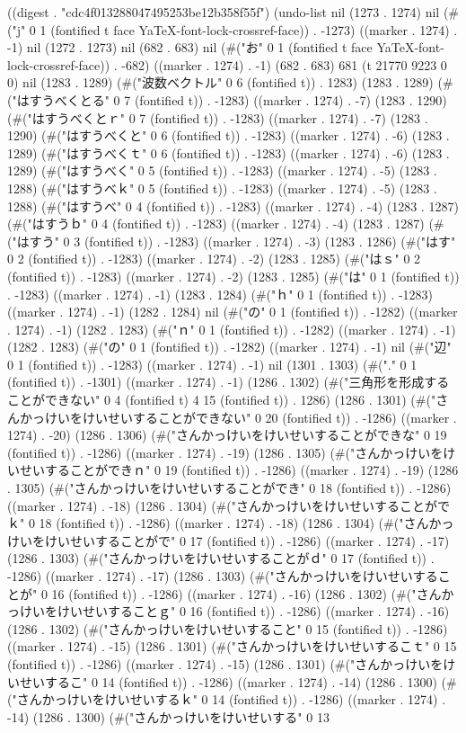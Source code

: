 
((digest . "cdc4f013288047495253be12b358f55f") (undo-list nil (1273 . 1274) nil (#("j" 0 1 (fontified t face YaTeX-font-lock-crossref-face)) . -1273) ((marker . 1274) . -1) nil (1272 . 1273) nil (682 . 683) nil (#("お" 0 1 (fontified t face YaTeX-font-lock-crossref-face)) . -682) ((marker . 1274) . -1) (682 . 683) 681 (t 21770 9223 0 0) nil (1283 . 1289) (#("波数ベクトル" 0 6 (fontified t)) . 1283) (1283 . 1289) (#("はすうべくとる" 0 7 (fontified t)) . -1283) ((marker . 1274) . -7) (1283 . 1290) (#("はすうべくとｒ" 0 7 (fontified t)) . -1283) ((marker . 1274) . -7) (1283 . 1290) (#("はすうべくと" 0 6 (fontified t)) . -1283) ((marker . 1274) . -6) (1283 . 1289) (#("はすうべくｔ" 0 6 (fontified t)) . -1283) ((marker . 1274) . -6) (1283 . 1289) (#("はすうべく" 0 5 (fontified t)) . -1283) ((marker . 1274) . -5) (1283 . 1288) (#("はすうべｋ" 0 5 (fontified t)) . -1283) ((marker . 1274) . -5) (1283 . 1288) (#("はすうべ" 0 4 (fontified t)) . -1283) ((marker . 1274) . -4) (1283 . 1287) (#("はすうｂ" 0 4 (fontified t)) . -1283) ((marker . 1274) . -4) (1283 . 1287) (#("はすう" 0 3 (fontified t)) . -1283) ((marker . 1274) . -3) (1283 . 1286) (#("はす" 0 2 (fontified t)) . -1283) ((marker . 1274) . -2) (1283 . 1285) (#("はｓ" 0 2 (fontified t)) . -1283) ((marker . 1274) . -2) (1283 . 1285) (#("は" 0 1 (fontified t)) . -1283) ((marker . 1274) . -1) (1283 . 1284) (#("ｈ" 0 1 (fontified t)) . -1283) ((marker . 1274) . -1) (1282 . 1284) nil (#("の" 0 1 (fontified t)) . -1282) ((marker . 1274) . -1) (1282 . 1283) (#("ｎ" 0 1 (fontified t)) . -1282) ((marker . 1274) . -1) (1282 . 1283) (#("の" 0 1 (fontified t)) . -1282) ((marker . 1274) . -1) nil (#("辺" 0 1 (fontified t)) . -1283) ((marker . 1274) . -1) nil (1301 . 1303) (#("." 0 1 (fontified t)) . -1301) ((marker . 1274) . -1) (1286 . 1302) (#("三角形を形成することができない" 0 4 (fontified t) 4 15 (fontified t)) . 1286) (1286 . 1301) (#("さんかっけいをけいせいすることができない" 0 20 (fontified t)) . -1286) ((marker . 1274) . -20) (1286 . 1306) (#("さんかっけいをけいせいすることができな" 0 19 (fontified t)) . -1286) ((marker . 1274) . -19) (1286 . 1305) (#("さんかっけいをけいせいすることができｎ" 0 19 (fontified t)) . -1286) ((marker . 1274) . -19) (1286 . 1305) (#("さんかっけいをけいせいすることができ" 0 18 (fontified t)) . -1286) ((marker . 1274) . -18) (1286 . 1304) (#("さんかっけいをけいせいすることがでｋ" 0 18 (fontified t)) . -1286) ((marker . 1274) . -18) (1286 . 1304) (#("さんかっけいをけいせいすることがで" 0 17 (fontified t)) . -1286) ((marker . 1274) . -17) (1286 . 1303) (#("さんかっけいをけいせいすることがｄ" 0 17 (fontified t)) . -1286) ((marker . 1274) . -17) (1286 . 1303) (#("さんかっけいをけいせいすることが" 0 16 (fontified t)) . -1286) ((marker . 1274) . -16) (1286 . 1302) (#("さんかっけいをけいせいすることｇ" 0 16 (fontified t)) . -1286) ((marker . 1274) . -16) (1286 . 1302) (#("さんかっけいをけいせいすること" 0 15 (fontified t)) . -1286) ((marker . 1274) . -15) (1286 . 1301) (#("さんかっけいをけいせいするこｔ" 0 15 (fontified t)) . -1286) ((marker . 1274) . -15) (1286 . 1301) (#("さんかっけいをけいせいするこ" 0 14 (fontified t)) . -1286) ((marker . 1274) . -14) (1286 . 1300) (#("さんかっけいをけいせいするｋ" 0 14 (fontified t)) . -1286) ((marker . 1274) . -14) (1286 . 1300) (#("さんかっけいをけいせいする" 0 13 